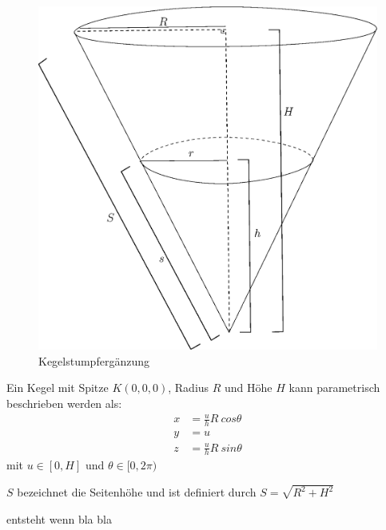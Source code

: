 \begin{figure}[!htb]
	\centering
	\includegraphics[scale=.5]{images/fullCone3.eps}
	\caption{Kegelstumpfergänzung}
	\label{fig:coneWithFrustum}
\end{figure}
Ein Kegel mit Spitze $K(0,0,0)$, Radius $R$ und Höhe $H$ kann parametrisch beschrieben werden als:
\begin{equation}
\begin{aligned}
x &= \frac{u}{h} R~cos \theta \\
y &= u \\
z &= \frac{u}{h} R~sin \theta
\end{aligned}
\end{equation}
mit $u\in [0, H]$ und $\theta \in [0, 2\pi)$ 

$S$ bezeichnet die Seitenhöhe und ist definiert durch $S = \sqrt{R^2 + H^2}$

\begin{definition}[Kegelstumpf]
	entsteht wenn bla bla 
\end{definition}

